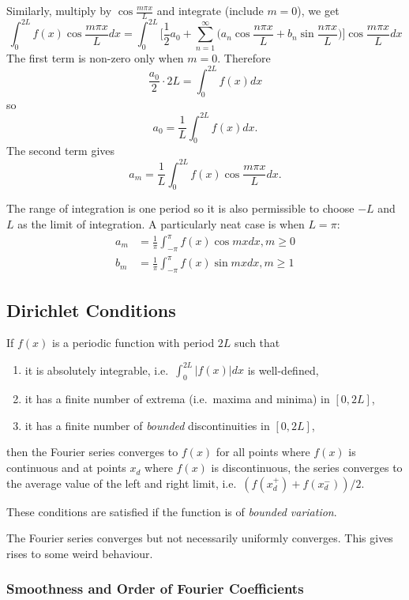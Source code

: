 \documentclass[a4paper]{article}
\begin{document}
Similarly, multiply by $\cos \frac{m\pi x}{L}$ and integrate (include $m=0$), we get
\[
  \int_0^{2L} f(x)\cos\frac{m\pi x}{L} dx = \int_0^{2L} \Bigg[ \frac{1}{2}a_0 + \sum_{n=1}^\infty \Big(a_n\cos\frac{n\pi x}{L} +b_n\sin\frac{n\pi x}{L}\Big) \Bigg] \cos\frac{m\pi x}{L} dx
\]
The first term is non-zero only when $m=0$. Therefore
\[
  \frac{a_0}{2} \cdot 2L = \int_0^{2L} f(x) dx
\]
so
\[
  a_0 = \frac{1}{L}\int_0^{2L} f(x) dx.
\]
The second term gives
\[
  a_m = \frac{1}{L} \int_0^{2L} f(x) \cos\frac{m\pi x}{L} dx.
\]

The range of integration is one period so it is also permissible to choose $-L$ and $L$ as the limit of integration. A particularly neat case is when $L=\pi$:
\begin{align*}
  a_m &= \frac{1}{\pi} \int_{-\pi}^\pi f(x) \cos mx dx, m\geq0 \\
  b_m &= \frac{1}{\pi} \int_{-\pi}^\pi f(x) \sin mx dx, m\geq1
\end{align*}

\subsection{Dirichlet Conditions}

If $f(x)$ is a periodic function with period $2L$ such that
\begin{enumerate}
\item it is absolutely integrable, i.e.\ $\int_0^{2L}|f(x)| dx$ is well-defined,
\item it has a finite number of extrema (i.e.\ maxima and minima) in $[0,2L]$,
  \item it has a finite number of \emph{bounded} discontinuities in $[0,2L]$,
\end{enumerate}
then the Fourier series converges to $f(x)$ for all points where $f(x)$ is continuous and at points $x_d$ where $f(x)$ is discontinuous, the series converges to the average value of the left and right limit, i.e.\ $(f(x_d^+)+f(x_d^-))/2$.

These conditions are satisfied if the function is of \emph{bounded variation}.

\begin{remark}
  The Fourier series converges but not necessarily uniformly converges. This gives rises to some weird behaviour.
\end{remark}

\subsubsection{Smoothness and Order of Fourier Coefficients}
\end{document}
